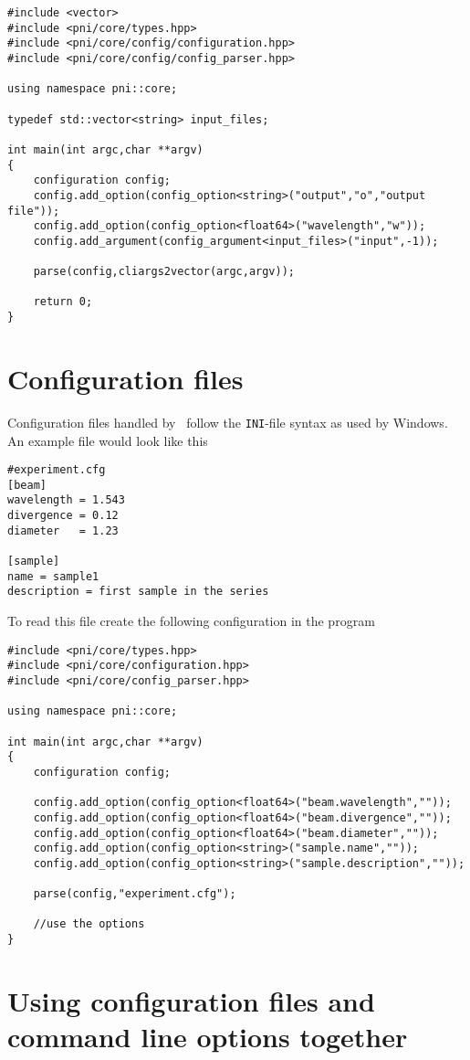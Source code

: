 \begin{verbatim}
#include <vector>
#include <pni/core/types.hpp>
#include <pni/core/config/configuration.hpp>
#include <pni/core/config/config_parser.hpp>

using namespace pni::core;

typedef std::vector<string> input_files;

int main(int argc,char **argv)
{
    configuration config;
    config.add_option(config_option<string>("output","o","output file"));
    config.add_option(config_option<float64>("wavelength","w"));
    config.add_argument(config_argument<input_files>("input",-1));

    parse(config,cliargs2vector(argc,argv));

    return 0;
}
\end{verbatim}

\section{Configuration files}

Configuration files handled by \libpnicore\ follow the {\tt INI}-file syntax as
used by Windows. 
An example file would look like this
\begin{verbatim}
#experiment.cfg
[beam]
wavelength = 1.543
divergence = 0.12
diameter   = 1.23

[sample]
name = sample1
description = first sample in the series
\end{verbatim}
To read this file create the following configuration in the program
\begin{verbatim}
#include <pni/core/types.hpp>
#include <pni/core/configuration.hpp>
#include <pni/core/config_parser.hpp>

using namespace pni::core;

int main(int argc,char **argv)
{
    configuration config;

    config.add_option(config_option<float64>("beam.wavelength",""));
    config.add_option(config_option<float64>("beam.divergence",""));
    config.add_option(config_option<float64>("beam.diameter",""));
    config.add_option(config_option<string>("sample.name",""));
    config.add_option(config_option<string>("sample.description",""));

    parse(config,"experiment.cfg");

    //use the options
}
\end{verbatim}


\section{Using configuration files and command line options together}

